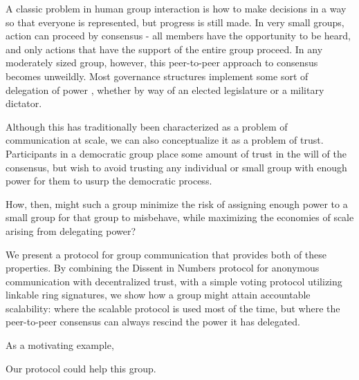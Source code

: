 %
A classic problem in human group interaction is how to make decisions in a way
so that everyone is represented, but progress is still made. In very small
groups, action can proceed by consensus - all members have the opportunity to be
heard, and only actions that have the support of the entire group proceed. In
any moderately sized group, however, this peer-to-peer approach to consensus
becomes unweildly. Most governance structures implement some sort of delegation
of power \tocite, whether by way of an elected legislature or a military
dictator.

Although this has traditionally been characterized as a problem of communication
at scale, we can also conceptualize it as a problem of trust. Participants in a
democratic group place some amount of trust in the will of the consensus, but
wish to avoid trusting any individual or small group with enough power for them
to usurp the democratic process.

How, then, might such a group minimize the risk of assigning enough power to a
small group for that group to misbehave, while maximizing the economies of scale
arising from delegating power?

We present a protocol for group communication that provides both of these
properties. By combining the Dissent in Numbers protocol for anonymous
communication with decentralized trust, with a simple voting protocol utilizing
linkable ring signatures, we show how a group might attain accountable
scalability: where the scalable protocol is used most of the time, but where
the peer-to-peer consensus can always rescind the power it has
delegated.

As a motivating example, 

Our protocol could help this group.


